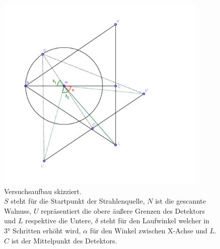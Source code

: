\begin{figure}
	\centering
	\includegraphics[width=0.9\textwidth]{k4.2/versuchsaufbau-skizze.png}
	\caption{Versuchsaufbau skizziert. \\
	$S$ steht für die Startpunkt der Strahlenquelle, $N$ ist die gescannte Walnuss, $U$ repräsentiert die obere äußere Grenzen des Detektors und $L$ respektive die Untere, $\delta$ steht für den Laufwinkel welcher in 3° Schritten erhöht wird, $\alpha$ für den Winkel zwischen X-Achse und $L$. $C$ ist der Mittelpunkt des Detektors.
	}
	\label{k4.2.fig.skizze}
\end{figure}

